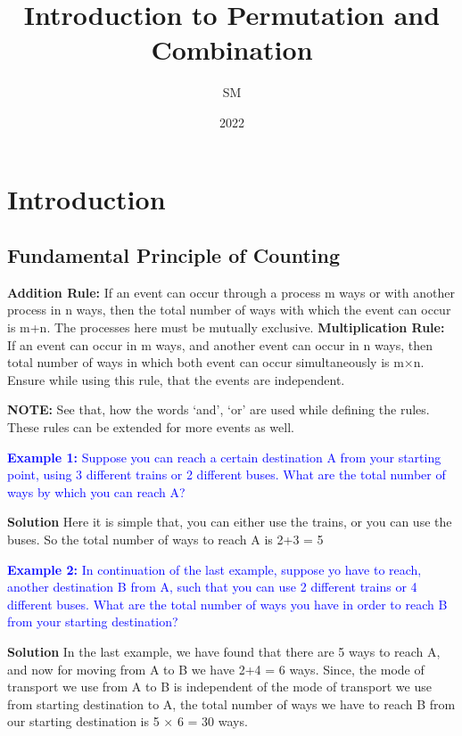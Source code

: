 \documentclass[12pt, a4paper]{article}
\title{Introduction to Permutation and Combination}
\author{SM}
\date{2022}
\begin{document}
\maketitle
\newpage
\tableofcontents
\newpage

\section{Introduction}
\subsection{Fundamental Principle of Counting}
\begin{tcolorbox}[colback=ProcessBlue!10!White,colframe=Blue!60!White]
\textbf{Addition Rule:} If an event can occur through a process m ways or with another process in n ways, then the total number of ways with which the event can occur is m+n. The processes here must be mutually exclusive.\newline
\textbf{Multiplication Rule:} If an event can occur in m ways, and another event can occur in n ways, then total number of ways in which both event can occur simultaneously is m×n. Ensure while using this rule, that the events are independent.
\end{tcolorbox}
\textbf{NOTE:} See that, how the words `and', `or' are used while defining the rules. These rules can be extended for more events as well.

\textcolor{blue}{\textbf{Example 1:} Suppose you can reach a certain destination A from your starting point, using 3 different trains or 2 different buses. What are the total number of ways by which you can reach A?}

\textbf{Solution} Here it is simple that, you can either use the trains, or you can use the buses. So the total number of ways to reach A is 2+3 = 5

\textcolor{blue}{\textbf{Example 2:} In continuation of the last example, suppose yo have to reach, another destination B from A, such that you can use 2 different trains or 4 different buses. What are the total number of ways you have in order to reach B from your starting destination?}

\textbf{Solution} In the last example, we have found that there are 5 ways to reach A, and now for moving from A to B we have 2+4 = 6 ways. Since, the mode of transport we use from A to B is independent of the mode of transport we use from starting destination to A, the total number of ways we have to reach B from our starting destination is 5 × 6 = 30 ways. \vspace{5mm}
\end{document}
